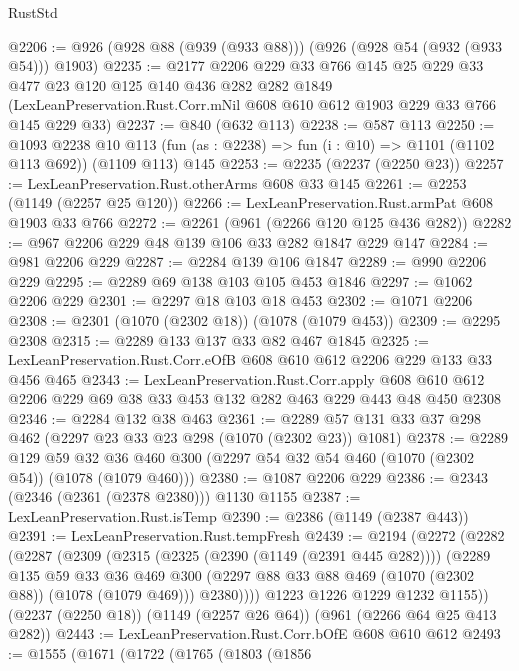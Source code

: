 \begin{lexlean}{RustStd}
\begin{coremodule}
@2206 := @926 (@928 @88 (@939 (@933 @88))) (@926 (@928 @54 (@932 (@933 @54))) @1903)
@2235 := @2177
    @2206
    @229
    @33
    @766
    @145
    @25
    @229
    @33
    @477
    @23
    @120
    @125
    @140
    @436
    @282
    @282
    @1849
    (LexLeanPreservation.Rust.Corr.mNil @608 @610 @612 @1903 @229 @33 @766 @145 @229 @33)
@2237 := @840 (@632 @113)
@2238 := @587 @113
@2250 := @1093
    @2238
    @10
    @113
    (fun (as : @2238) => fun (i : @10) => @1101 (@1102 @113 @692))
    (@1109 @113)
    @145
@2253 := @2235 (@2237 (@2250 @23))
@2257 := LexLeanPreservation.Rust.otherArms @608 @33 @145
@2261 := @2253 (@1149 (@2257 @25 @120))
@2266 := LexLeanPreservation.Rust.armPat @608 @1903 @33 @766
@2272 := @2261 (@961 (@2266 @120 @125 @436 @282))
@2282 := @967 @2206 @229 @48 @139 @106 @33 @282 @1847 @229 @147
@2284 := @981 @2206 @229
@2287 := @2284 @139 @106 @1847
@2289 := @990 @2206 @229
@2295 := @2289 @69 @138 @103 @105 @453 @1846
@2297 := @1062 @2206 @229
@2301 := @2297 @18 @103 @18 @453
@2302 := @1071 @2206
@2308 := @2301 (@1070 (@2302 @18)) (@1078 (@1079 @453))
@2309 := @2295 @2308
@2315 := @2289 @133 @137 @33 @82 @467 @1845
@2325 := LexLeanPreservation.Rust.Corr.eOfB @608 @610 @612 @2206 @229 @133 @33 @456 @465
@2343 := LexLeanPreservation.Rust.Corr.apply
    @608
    @610
    @612
    @2206
    @229
    @69
    @38
    @33
    @453
    @132
    @282
    @463
    @229
    @443
    @48
    @450
    @2308
@2346 := @2284 @132 @38 @463
@2361 := @2289 @57 @131 @33 @37 @298 @462 (@2297 @23 @33 @23 @298 (@1070 (@2302 @23)) @1081)
@2378 := @2289
    @129
    @59
    @32
    @36
    @460
    @300
    (@2297 @54 @32 @54 @460 (@1070 (@2302 @54)) (@1078 (@1079 @460)))
@2380 := @1087 @2206 @229
@2386 := @2343 (@2346 (@2361 (@2378 @2380))) @1130 @1155
@2387 := LexLeanPreservation.Rust.isTemp
@2390 := @2386 (@1149 (@2387 @443))
@2391 := LexLeanPreservation.Rust.tempFresh
@2439 := @2194
    (@2272
      (@2282
        (@2287
          (@2309
            (@2315
              (@2325 (@2390 (@1149 (@2391 @445 @282))))
              (@2289
                @135
                @59
                @33
                @36
                @469
                @300
                (@2297 @88 @33 @88 @469 (@1070 (@2302 @88)) (@1078 (@1079 @469)))
                @2380))))
        @1223
        @1226
        @1229
        @1232
        @1155))
    (@2237 (@2250 @18))
    (@1149 (@2257 @26 @64))
    (@961 (@2266 @64 @25 @413 @282))
@2443 := LexLeanPreservation.Rust.Corr.bOfE @608 @610 @612
@2493 := @1555
    (@1671
      (@1722
        (@1765
          (@1803
            (@1856

\end{coremodule}
\end{lexlean}
